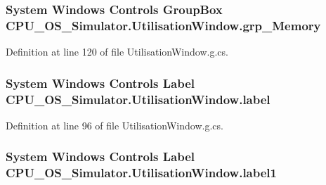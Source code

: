 \subsubsection[{grp\+\_\+\+Memory}]{\setlength{\rightskip}{0pt plus 5cm}System Windows Controls Group\+Box C\+P\+U\+\_\+\+O\+S\+\_\+\+Simulator.\+Utilisation\+Window.\+grp\+\_\+\+Memory\hspace{0.3cm}{\ttfamily [package]}}\label{class_c_p_u___o_s___simulator_1_1_utilisation_window_a8eb460220e13b601c32417a50f108590}


Definition at line 120 of file Utilisation\+Window.\+g.\+cs.

\hypertarget{class_c_p_u___o_s___simulator_1_1_utilisation_window_aa45faea5a6347cb26639a4e279117ecf}{}
\subsubsection[{label}]{\setlength{\rightskip}{0pt plus 5cm}System Windows Controls Label C\+P\+U\+\_\+\+O\+S\+\_\+\+Simulator.\+Utilisation\+Window.\+label\hspace{0.3cm}{\ttfamily [package]}}\label{class_c_p_u___o_s___simulator_1_1_utilisation_window_aa45faea5a6347cb26639a4e279117ecf}


Definition at line 96 of file Utilisation\+Window.\+g.\+cs.

\hypertarget{class_c_p_u___o_s___simulator_1_1_utilisation_window_a72a3333fa298d3d899eb3380e4a54781}{}
\subsubsection[{label1}]{\setlength{\rightskip}{0pt plus 5cm}System Windows Controls Label C\+P\+U\+\_\+\+O\+S\+\_\+\+Simulator.\+Utilisation\+Window.\+label1\hspace{0.3cm}{\ttfamily [package]}}\label{class_c_p_u___o_s___simulator_1_1_utilisation_window_a72a3333fa298d3d899eb3380e4a54781}


